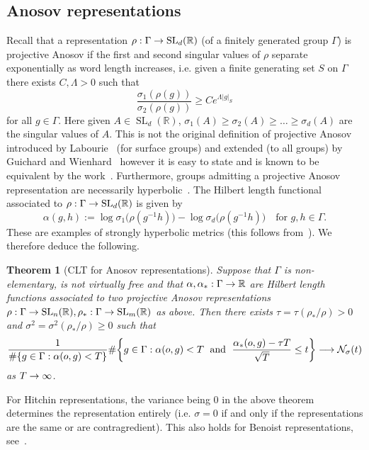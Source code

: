\documentclass[10pt]{amsart}
\newtheorem{theo}{Theorem}[section]
\theoremstyle{definition}\newtheorem{defi}[theo]{Definition}\newtheorem{rema}[theo]{Remark}\newtheorem{exam}[theo]{Example}\newtheorem{exem}[theo]{Example}\newtheorem{nota}[theo]{Notation}
\newcommand{\G}{\Gamma}
\newcommand{\Nc}{\mathcal{N}}
\newcommand{\R}{\mathbb{R}}
\DeclareMathOperator{\SL}{SL}
\let\originalleft\left
\let\originalright\right
\renewcommand{\left}{\mathopen{}\mathclose\bgroup\originalleft}
\renewcommand{\right}{\aftergroup\egroup\originalright}
\renewcommand*{\to}{\mathchoice{\longrightarrow}{\rightarrow}{\rightarrow}{\rightarrow}}
\theoremstyle{plain}
\begin{document}
\subsection{Anosov representations}

Recall that a representation $\rho: \G \to \SL_d(\R)$ (of a finitely generated group $\G$) is projective Anosov if the first and second singular values of $\rho$ separate exponentially as word length increases, i.e. given a finite generating set $S$ on $\G$ there exists $C, \Lambda >0$ such that
\[
\frac{\sigma_1(\rho(g))}{\sigma_2(\rho(g))} \ge C e^{\Lambda |g|_S}
\]
for all $g\in\G$. Here given $A \in \SL_d(\R)$, $\sigma_1(A) \ge \sigma_2(A) \ge \dots \ge \sigma_d(A)$ are the singular values of $A$. This is not the original definition of projective Anosov introduced by Labourie~\cite{Labourie} (for surface groups) and extended (to all groups) by Guichard and Wienhard~\cite{GuichardWeinhard} however it is easy to state and is known to be equivalent by the work~\cite{BochiPotrieSambarino}. Furthermore, groups admitting a projective Anosov representation are necessarily hyperbolic~\cite{BochiPotrieSambarino}. The Hilbert length functional associated to $\rho: \G \to \SL_d(\R)$ is given by
\[
\alpha(g,h) := \log\sigma_1\bigl(\rho(g^{-1}h)\bigr) - \log\sigma_d\bigl(\rho(g^{-1}h)\bigr) \quad \text{for $g,h \in \G$.}
\]
These are examples of strongly hyperbolic metrics (this follows from~\cite[Lemma 7.1]{cantrell.tanaka.2}). We therefore deduce the following.

\pagebreak{}
\begin{theo}[CLT for Anosov representations]
Suppose that $\G$ is non-elementary, is not virtually free and that $\alpha, \alpha_\ast: \G \to \R$ are Hilbert length functions associated to two projective Anosov representations $\rho : \G \to \SL_n(\R), \rho_\ast : \G \to \SL_m(\R)$ as above. Then there exists $\tau = \tau(\rho_\ast/\rho) >0$ and $\sigma^2 = \sigma^2(\rho_\ast/\rho) \ge 0$ such that
\begin{align*}
\frac{1}{\#\left\{ g\in\G: \alpha(o,g) < T\right\}}
\#\left\{ g\in\G: \alpha(o,g) < T \;\text{ and } \; \frac{\alpha_\ast(o,g) - \tau T}{\sqrt{T}} \le t \right\} \to \Nc_\sigma(t)
\end{align*}
as $T\to\infty$.
\end{theo}

For Hitchin representations, the variance being $0$ in the above theorem determines the representation entirely (i.e. $\sigma = 0$ if and only if the representations are the same or are contragredient). This also holds for Benoist representations, see~\cite[Remark~7.11]{weinhardetal}.
\end{document}
